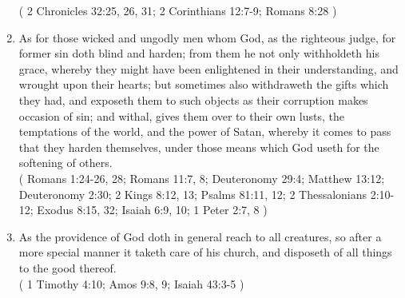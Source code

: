 \documentclass[12pt,a4paper]{book}
\begin{document}
\begin{enumerate}
( 2 Chronicles 32:25, 26, 31; 2 Corinthians 12:7-9; Romans 8:28 )
\item As for those wicked and ungodly men whom God, as the righteous judge, for former sin doth blind and harden; from them he not only withholdeth his grace, whereby they might have been enlightened in their understanding, and wrought upon their hearts; but sometimes also withdraweth the gifts which they had, and exposeth them to such objects as their corruption makes occasion of sin; and withal, gives them over to their own lusts, the temptations of the world, and the power of Satan, whereby it comes to pass that they harden themselves, under those means which God useth for the softening of others.\\
( Romans 1:24-26, 28; Romans 11:7, 8; Deuteronomy 29:4; Matthew 13:12; Deuteronomy 2:30; 2 Kings 8:12, 13; Psalms 81:11, 12; 2 Thessalonians 2:10-12; Exodus 8:15, 32; Isaiah 6:9, 10; 1 Peter 2:7, 8 )
\item As the providence of God doth in general reach to all creatures, so after a more special manner it taketh care of his church, and disposeth of all things to the good thereof.\\
( 1 Timothy 4:10; Amos 9:8, 9; Isaiah 43:3-5 )
\end{enumerate}
\end{document}
